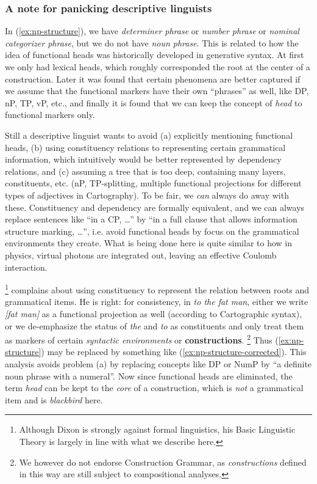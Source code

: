 \documentclass[a4paper, oneside, scheme=plain, 12pt]{article}
\newcommand*{\citepage}[1]{p.~{#1}}
\newcommand*{\concept}[1]{\textbf{#1}}
\newcommand*{\term}[1]{\emph{#1}}
\newcommand{\form}[1]{\emph{#1}}
\begin{document}
\subsubsection{A note for panicking descriptive linguists}\label{sec:remove-functional-heads}

In (\ref{ex:np-structure}), we have \term{determiner phrase} or \term{number phrase} or \term{nominal categorizer phrase},
but we do not have \term{noun phrase}.
This is related to how the idea of functional heads was historically developed in generative syntax.
At first we only had lexical heads, which roughly corresponded the root at the center of a construction.
Later it was found that certain phenomena are better captured
if we assume that the functional markers have their own ``phrases'' as well,
like DP, nP, TP, vP, etc.,
and finally it is found that we can keep the concept of \term{head} to functional markers only.

Still a descriptive linguist wants to avoid 
(a) explicitly mentioning functional heads,
(b) using constituency relations to representing certain grammatical information, which intuitively would be better represented by dependency relations, and 
(c) assuming a tree that is too deep, containing many layers, constituents, etc. (nP, TP-splitting, multiple functional projections for different types of adjectives in Cartography).
To be fair, we \emph{can} always do away with these.
Constituency and dependency are formally equivalent,
and we can always replace sentences like ``in a CP, \dots''
by ``in a full clause that allows information structure marking, \dots'',
i.e. avoid functional heads by focus on the grammatical environments they create.
What is being done here is quite similar to how in physics,
virtual photons are integrated out, leaving an effective Coulomb interaction.

\citet[\citepage{49}]{dixon2009basic1}%
\footnote{
    Although Dixon is strongly against formal linguistics,
    his Basic Linguistic Theory is largely in line with what we describe here.
}
complains about using constituency
to represent the relation between roots and grammatical items.
He is right: for consistency, in \form{to the fat man},
either we write \form{[fat man]} as a functional projection
as well (according to Cartographic syntax),
or we de-emphasize the status of \form{the} and \form{to} as constituents
and only treat them as markers of certain \emph{syntactic environments}
or \concept{constructions}.%
\footnote{
    We however do not endorse Construction Grammar,
    as \term{constructions} defined in this way are still subject to compositional analyses.
}
Thus (\ref{ex:np-structure}) may be replaced by something like (\ref{ex:np-structure-corrected}).
This analysis avoids problem (a) by replacing concepts like DP or NumP
by ``a definite noun phrase with a numeral''.
Now since functional heads are eliminated, the term \term{head} can be kept
to the \emph{core} of a construction, which is \emph{not} a grammatical item and is \form{blackbird} here.
\end{document}
